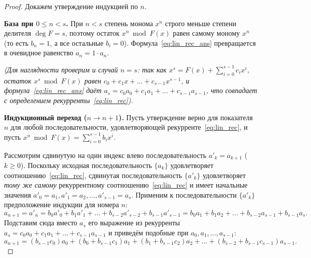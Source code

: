 \begin{proof}
    Докажем утверждение индукцией по $n$.

    \textbf{База при $0 \le n < s$.} При $n < s$ степень монома $x^n$ строго меньше степени делителя $\deg F = s$, поэтому остаток $x^n \bmod F(x)$ равен самому моному $x^n$ (то есть $b_n = 1$, а все остальные $b_i = 0$). Формула~\eqref{eq:lin_rec_ans} превращается в очевидное равенство $a_n = 1 \cdot a_n$.

    \textit{(Для наглядности проверим и случай $n = s$: так как $x^s = F(x) + \sum_{i=0}^{s-1} c_i x^i$, остаток $x^s \bmod F(x)$ равен $c_0 + c_1 x + \dots + c_{s-1} x^{s-1}$, и формула~\eqref{eq:lin_rec_ans} даёт $a_s = c_0 a_0 + c_1 a_1 + \dots + c_{s-1} a_{s-1}$, что совпадает с определением рекурренты~\eqref{eq:lin_rec}).}

    \textbf{Индукционный переход ($n \to n + 1$).} Пусть утверждение верно для показателя $n$ для любой последовательности, удовлетворяющей рекурренте~\eqref{eq:lin_rec}, и пусть $x^n \bmod F(x) = \sum_{i=0}^{s-1} b_i x^i$.

    Рассмотрим сдвинутую на один индекс влево последовательность $a'_k = a_{k+1}$ ($k \ge 0$). Поскольку исходная последовательность $\{a_k\}$ удовлетворяет соотношению~\eqref{eq:lin_rec}, сдвинутая последовательность $\{a'_k\}$ удовлетворяет \emph{тому же самому} рекуррентному соотношению~\eqref{eq:lin_rec} и имеет начальные значения $a'_0 = a_1, a'_1 = a_2, \dots, a'_{s-1} = a_s$. Применим к последовательности $\{a'_k\}$ предположение индукции для номера $n$:
    \[
        a_{n+1} = a'_n = b_0 a'_0 + b_1 a'_1 + \dots + b_{s-2} a'_{s-2} + b_{s-1} a'_{s-1} = b_0 a_1 + b_1 a_2 + \dots + b_{s-2} a_{s-1} + b_{s-1} a_s.
    \]
    Подставим сюда вместо $a_s$ его выражение из рекурренты $a_s = c_0 a_0 + c_1 a_1 + \dots + c_{s-1} a_{s-1}$ и приведём подобные при $a_0, a_1, \dots, a_{s-1}$:
    \begin{equation}\label{eq:an1_comb}
        a_{n+1} = (b_{s-1} c_0) a_0 + (b_0 + b_{s-1} c_1) a_1 + (b_1 + b_{s-1} c_2) a_2 + \dots + (b_{s-2} + b_{s-1} c_{s-1}) a_{s-1}.
    \end{equation}


\end{proof}
